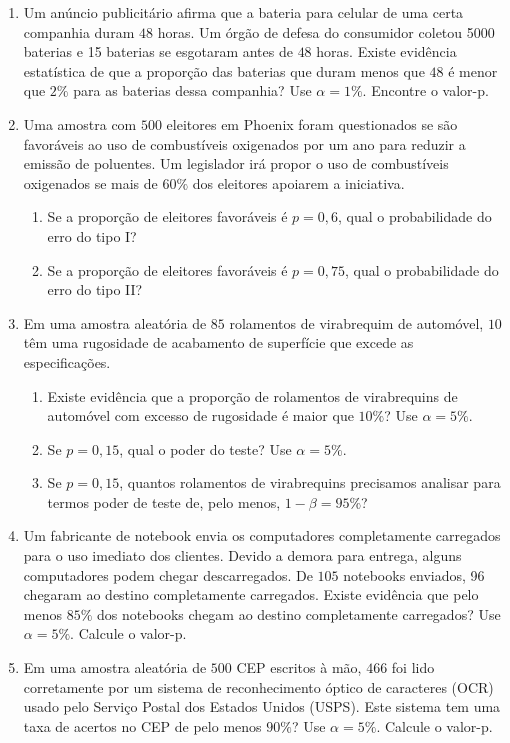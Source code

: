 \documentclass[12pt, a4paper]{article}
\begin{document}
\begin{enumerate}
	\item Um anúncio publicitário afirma que a bateria para celular de uma certa companhia duram $48$ horas. Um órgão de defesa do consumidor coletou 5000 baterias e  15 baterias se esgotaram antes de $48$ horas. Existe evidência estatística de que a proporção das baterias que duram menos que $48$ é menor que $2\%$ para as baterias dessa companhia? Use $\alpha=1\%$. Encontre o valor-p.
	
	\item Uma amostra com $500$ eleitores em Phoenix foram questionados se são favoráveis ao uso de combustíveis oxigenados por um ano para reduzir a emissão de poluentes. Um legislador irá propor o uso  de combustíveis oxigenados se mais de $60\%$ dos eleitores apoiarem a iniciativa.
	\begin{enumerate}
		\item Se a proporção de eleitores favoráveis é $p=0,6$, qual o probabilidade do erro do tipo I?
		\item Se a proporção de eleitores favoráveis é $p=0,75$, qual o probabilidade do erro do tipo II?
	\end{enumerate}

	\item Em uma amostra aleatória de $85$ rolamentos de virabrequim de automóvel, $10$ têm uma rugosidade de acabamento de superfície que excede as especificações.
	\begin{enumerate}
		\item Existe evidência que a proporção de rolamentos de virabrequins de automóvel com excesso de rugosidade é maior que $10\%$? Use $\alpha=5\%$.
		\item Se $p=0,15$, qual o poder do teste? Use $\alpha=5\%$.
		\item Se $p=0,15$, quantos rolamentos de virabrequins precisamos analisar para termos poder de teste de, pelo menos, $1-\beta = 95\%$?
	\end{enumerate}
	
	\item Um fabricante de notebook envia os computadores completamente carregados para o uso imediato dos clientes. Devido a demora para entrega, alguns computadores podem chegar descarregados. De $105$ notebooks enviados, 96 chegaram ao destino completamente carregados. Existe evidência que pelo menos $85\%$ dos notebooks chegam ao destino completamente carregados? Use $\alpha=5\%$. Calcule o valor-p.
	
	\item Em uma amostra aleatória de $500$ CEP escritos à mão, $466$ foi lido corretamente por um sistema de reconhecimento óptico de caracteres (OCR) usado pelo Serviço Postal dos Estados Unidos (USPS). Este sistema tem uma taxa de acertos no CEP de pelo menos $90\%$? Use $\alpha=5\%$. Calcule o valor-p.
	
	
\end{enumerate}
\end{document}
